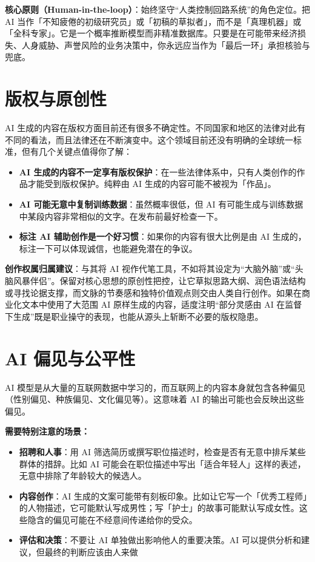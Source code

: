 \textbf{核心原则（Human-in-the-loop）}：始终坚守“人类控制回路系统”的角色定位。把 AI 当作「不知疲倦的初级研究员」或「初稿的草拟者」，而不是「真理机器」或「全科专家」。它是一个概率推断模型而非精准数据库。只要是在可能带来经济损失、人身威胁、声誉风险的业务决策中，你永远应当作为「最后一环」承担核验与兜底。

\section{版权与原创性}

AI 生成的内容在版权方面目前还有很多不确定性。不同国家和地区的法律对此有不同的看法，而且法律还在不断演变中。这个领域目前还没有明确的全球统一标准，但有几个关键点值得你了解：

\begin{itemize}
  \item \textbf{AI 生成的内容不一定享有版权保护}：在一些法律体系中，只有人类创作的作品才能受到版权保护。纯粹由 AI 生成的内容可能不被视为「作品」。
  \item \textbf{AI 可能无意中复制训练数据}：虽然概率很低，但 AI 有可能生成与训练数据中某段内容非常相似的文字。在发布前最好检查一下。
  \item \textbf{标注 AI 辅助创作是一个好习惯}：如果你的内容有很大比例是由 AI 生成的，标注一下可以体现诚信，也能避免潜在的争议。
\end{itemize}

\textbf{创作权属归属建议}：与其将 AI 视作代笔工具，不如将其设定为“大脑外脑”或“头脑风暴伴侣”。保留对核心思想的原创性把控，让它草拟思路大纲、润色语法结构或寻找论据支撑，而文脉的节奏感和独特价值观点则交由人类自行创作。如果在商业化文本中使用了大范围 AI 原样生成的内容，适度注明“部分灵感由 AI 在监督下生成”既是职业操守的表现，也能从源头上斩断不必要的版权隐患。

\section{AI 偏见与公平性}

AI 模型是从大量的互联网数据中学习的，而互联网上的内容本身就包含各种偏见（性别偏见、种族偏见、文化偏见等）。这意味着 AI 的输出可能也会反映出这些偏见。

\textbf{需要特别注意的场景：}

\begin{itemize}
  \item \textbf{招聘和人事}：用 AI 筛选简历或撰写职位描述时，检查是否有无意中排斥某些群体的措辞。比如 AI 可能会在职位描述中写出「适合年轻人」这样的表述，无意中排除了年龄较大的候选人。
  \item \textbf{内容创作}：AI 生成的文案可能带有刻板印象。比如让它写一个「优秀工程师」的人物描述，它可能默认写成男性；写「护士」的故事可能默认写成女性。这些隐含的偏见可能在不经意间传递给你的受众。
  \item \textbf{评估和决策}：不要让 AI 单独做出影响他人的重要决策。AI 可以提供分析和建议，但最终的判断应该由人来做
\end{itemize}

